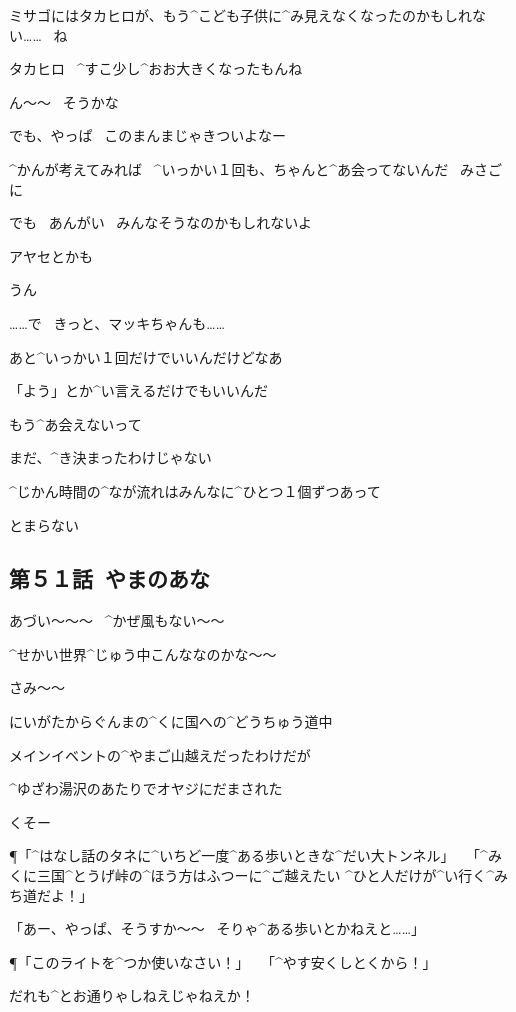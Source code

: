 \A ミサゴにはタカヒロが、もう^{こども}{子供}に^{み}{見}えなくなったのかもしれない……
\ ね

\page
\A タカヒロ
\ ^{すこ}{少}し^{おお}{大}きくなったもんね

\page
\T ん〜〜
\ そうかな

\T でも、やっぱ
\ このまんまじゃきついよなー

\T ^{かんが}{考}えてみれば
\ ^{いっかい}{１回}も、ちゃんと^{あ}{会}ってないんだ
\ みさごに

\page
\A でも
\ あんがい
\ みんなそうなのかもしれないよ

\T アヤセとかも

\A うん

\A ……で
\ きっと、マッキちゃんも……

\page
\T あと^{いっかい}{１回}だけでいいんだけどなあ

\T 「よう」とか^{い}{言}えるだけでもいいんだ

\T もう^{あ}{会}えないって

\T まだ、^{き}{決}まったわけじゃない

\page[104]
\A ^{じかん}{時間}の^{なが}{流}れはみんなに^{ひとつ}{１個}ずつあって

\A とまらない


\subsection{第５１話\ やまのあな}

\page[107]
\A あづい〜〜〜
\ ^{かぜ}{風}もない〜〜

\A ^{せかい}{世界}^{じゅう}{中}こんななのかな〜〜

\page
\Y さみ〜〜

\Y にいがたからぐんまの^{くに}{国}への^{どうちゅう}{道中}

\Y メインイベントの^{やまご}{山越}えだったわけだが

\Y ^{ゆざわ}{湯沢}のあたりでオヤジにだまされた

\Y くそー

\page
\P 「^{はなし}{話}のタネに^{いちど}{一度}^{ある}{歩}いときな^{だい}{大}トンネル」
\ 「^{みくに}{三国}^{とうげ}{峠}の^{ほう}{方}はふつーに^{ご}{越}えたい
  ^{ひと}{人}だけが^{い}{行}く^{みち}{道}だよ！」

\Y 「あー、やっぱ、そうすか〜〜
  \ そりゃ^{ある}{歩}いとかねえと……」

\P 「このライトを^{つか}{使}いなさい！」
\ 「^{やす}{安}くしとくから！」

\page
\Y だれも^{とお}{通}りゃしねえじゃねえか！

